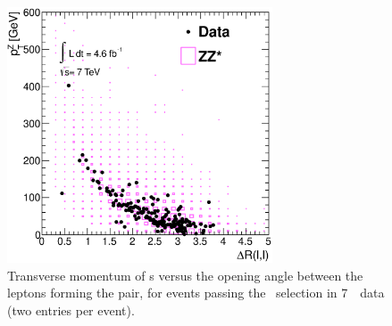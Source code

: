  \begin{figure}[htbp]
 \begin{center}
  \includegraphics[width=0.7\textwidth]{7TeV/h_dr_ptz}\hfill
  \caption[Transverse momentum of \leppair s versus the opening angle between the leptons
    forming the pair, for events passing the \ZZs\ selection in 7~\tev\ data.]
    {\small Transverse momentum of  \leppair s versus the opening angle between the leptons
    forming the pair, for events passing the \ZZs\ selection in 7~\tev\ data (two
    entries per event).}
 \label{fig:zzdists-dr-ptz-seven}
 \end{center}
 \end{figure}


